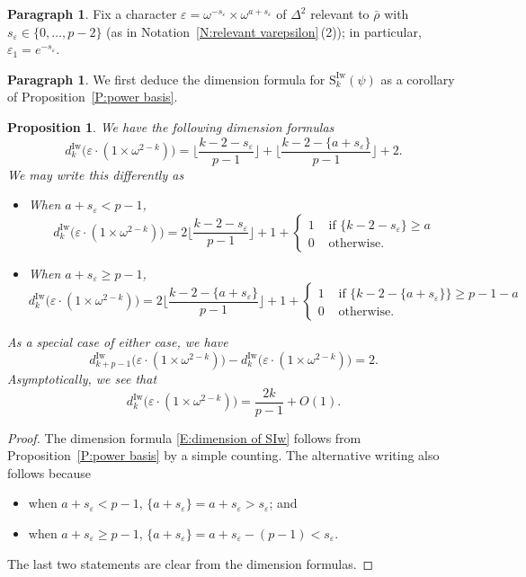 \documentclass[12pt]{amsart}
\newtheorem{proposition}[subsection]{Proposition}
\theoremstyle{definition}
\newtheorem{para}[subsection]{Paragraph}
\numberwithin{equation}{subsection}
\def\rmS{\mathrm{S}}
\newcommand{\Iw}{\mathrm{Iw}}
\begin{document}
\begin{para}
\label{P:para_122}
Fix a character $\varepsilon = \omega^{-s_\varepsilon} \times \omega^{a+s_\varepsilon}$ of $\Delta^2$ relevant to $\bar \rho$ with $s_\varepsilon \in \{0, \dots, p-2\}$ (as in Notation~\ref{N:relevant varepsilon}\,(2)); in particular, $\varepsilon_1 = e^{-s_\varepsilon}$.
\end{para}

\begin{para}
\label{P:para_123}
We first deduce the dimension formula for $\rmS_k^\Iw(\psi)$ as a corollary of Proposition~\ref{P:power basis}.
\end{para}




\begin{proposition}
\label{P:dimension of SIw}We have the following dimension formulas
\begin{equation}
\label{E:dimension of SIw}
d_{k}^\Iw\big(\varepsilon\cdot (1\times \omega^{2-k})\big) = \Big\lfloor \frac{k-2-s_\varepsilon}{p-1}\Big\rfloor + \Big\lfloor \frac{k-2-\{a+s_\varepsilon\}}{p-1}\Big\rfloor +2.
\end{equation}
We may write this differently as
\begin{itemize}
\item When $a+s_\varepsilon<p-1$,
$$
d_{k}^\Iw\big(\varepsilon\cdot (1\times \omega^{2-k})\big) = 2\Big\lfloor \frac{k-2-s_\varepsilon}{p-1}\Big\rfloor +1+ \begin{cases}
1 & \textrm{ if } \{k-2-s_\varepsilon\} \geq a\\ 0 & \textrm{ otherwise.}
\end{cases}
$$
\item When $a+s_\varepsilon\geq p-1$,
$$
d_{k}^\Iw\big(\varepsilon\cdot (1\times \omega^{2-k})\big) = 2\Big\lfloor \frac{k-2-\{a+s_\varepsilon\}}{p-1}\Big\rfloor +1+ \begin{cases}
1 & \textrm{ if } \{k-2-\{a+s_\varepsilon\}\} \geq p-1-a\\ 0 & \textrm{ otherwise.}
\end{cases}
$$
\end{itemize}
As a special case of either case, we have
\[
d_{k+p-1}^\Iw\big(\varepsilon\cdot (1\times \omega^{2-k})\big) - d_{k}^\Iw\big(\varepsilon\cdot (1\times \omega^{2-k})\big) = 2.
\]
Asymptotically, we see that $$d_k^\Iw \big(\varepsilon\cdot(1 \times \omega^{2-k})\big) = \frac{2k}{p-1} + O(1).$$
\end{proposition}
\begin{proof}
The dimension formula \eqref{E:dimension of SIw} follows from Proposition~\ref{P:power basis} by a simple counting. The alternative writing also follows because
\begin{itemize}
\item when $a+s_\varepsilon<p-1$, $\{a+s_\varepsilon\} = a+s_\varepsilon > s_\varepsilon$; and
\item when $a+s_\varepsilon \geq p-1$, $\{a+s_\varepsilon\} = a+s_\varepsilon-(p-1)< s_\varepsilon$.
\end{itemize}
The last two statements are clear from the dimension formulas.
\end{proof}
\end{document}
